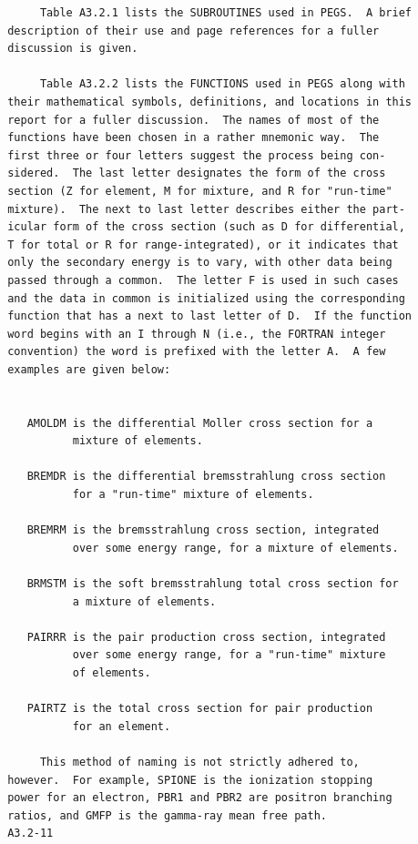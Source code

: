 \newpage {} \begin{verbatim}
      Table A3.2.1 lists the SUBROUTINES used in PEGS.  A brief
 description of their use and page references for a fuller
 discussion is given.

      Table A3.2.2 lists the FUNCTIONS used in PEGS along with
 their mathematical symbols, definitions, and locations in this
 report for a fuller discussion.  The names of most of the
 functions have been chosen in a rather mnemonic way.  The
 first three or four letters suggest the process being con-
 sidered.  The last letter designates the form of the cross
 section (Z for element, M for mixture, and R for "run-time"
 mixture).  The next to last letter describes either the part-
 icular form of the cross section (such as D for differential,
 T for total or R for range-integrated), or it indicates that
 only the secondary energy is to vary, with other data being
 passed through a common.  The letter F is used in such cases
 and the data in common is initialized using the corresponding
 function that has a next to last letter of D.  If the function
 word begins with an I through N (i.e., the FORTRAN integer
 convention) the word is prefixed with the letter A.  A few
 examples are given below:


    AMOLDM is the differential Moller cross section for a
           mixture of elements.

    BREMDR is the differential bremsstrahlung cross section
           for a "run-time" mixture of elements.

    BREMRM is the bremsstrahlung cross section, integrated
           over some energy range, for a mixture of elements.

    BRMSTM is the soft bremsstrahlung total cross section for
           a mixture of elements.

    PAIRRR is the pair production cross section, integrated
           over some energy range, for a "run-time" mixture
           of elements.

    PAIRTZ is the total cross section for pair production
           for an element.

      This method of naming is not strictly adhered to,
 however.  For example, SPIONE is the ionization stopping
 power for an electron, PBR1 and PBR2 are positron branching
 ratios, and GMFP is the gamma-ray mean free path.
 A3.2-11
\end{verbatim}
